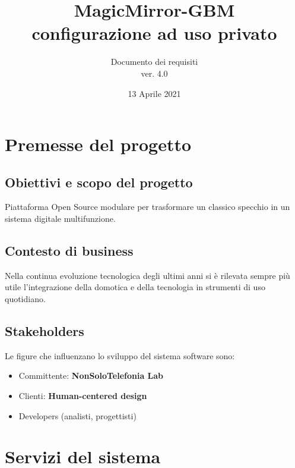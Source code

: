 \documentclass[a4paper,11pt,titlepage]{article}       %
\begin{document}
\author{Documento dei requisiti \\ ver. 4.0}                             %
\title{MagicMirror-GBM \\ configurazione ad uso privato}                    %
\date{13 Aprile 2021}                                %
\maketitle

\tableofcontents
\newpage


\section{Premesse del progetto}
    \subsection{Obiettivi e scopo del progetto}
        Piattaforma Open Source modulare per trasformare un classico specchio in un sistema digitale multifunzione.
    \subsection{Contesto di business}
        Nella continua evoluzione tecnologica degli ultimi anni si è rilevata sempre più utile l'integrazione della domotica e della tecnologia in strumenti di uso quotidiano.
    \subsection{Stakeholders}
        Le figure che influenzano lo sviluppo del sistema software sono:
        \begin{itemize}
            \item Committente: \textbf{NonSoloTelefonia Lab}
            \item Clienti: \textbf{\gls{Human-centered design}}
            \item Developers (analisti, progettisti)
        \end{itemize}

\newpage

\section{Servizi del sistema}
    
\end{document}
